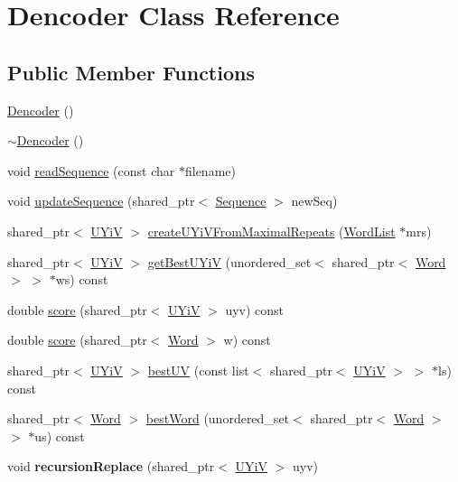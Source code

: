\hypertarget{classDencoder}{\section{Dencoder Class Reference}
\label{classDencoder}
}
\subsection*{Public Member Functions}
\begin{DoxyCompactItemize}
\item 
\hyperlink{classDencoder_a5e50eb7f889e5d1880111bf4cd42985b}{Dencoder} ()
\item 
\hyperlink{classDencoder_a1d030025676e52628f911f9262bfc892}{$\sim$\-Dencoder} ()
\item 
void \hyperlink{classDencoder_af5dc170b4feaff7ed8743ce1f7c17582}{read\-Sequence} (const char $\ast$filename)
\item 
void \hyperlink{classDencoder_aebc51ef45ee13914e51627b04a07ea27}{update\-Sequence} (shared\-\_\-ptr$<$ \hyperlink{classSequence}{Sequence} $>$ new\-Seq)
\item 
shared\-\_\-ptr$<$ \hyperlink{classUYiV}{U\-Yi\-V} $>$ \hyperlink{classDencoder_a2da7de0ad2cea870406d318316090583}{create\-U\-Yi\-V\-From\-Maximal\-Repeats} (\hyperlink{classWordList}{Word\-List} $\ast$mrs)
\item 
shared\-\_\-ptr$<$ \hyperlink{classUYiV}{U\-Yi\-V} $>$ \hyperlink{classDencoder_ad73c4ee6f7eb88cd2ecee07514d26b92}{get\-Best\-U\-Yi\-V} (unordered\-\_\-set$<$ shared\-\_\-ptr$<$ \hyperlink{classWord}{Word} $>$ $>$ $\ast$ws) const 
\item 
double \hyperlink{classDencoder_acfb48805d38b387440332b4f98d02bec}{score} (shared\-\_\-ptr$<$ \hyperlink{classUYiV}{U\-Yi\-V} $>$ uyv) const 
\item 
double \hyperlink{classDencoder_acb61796bd459bb115b277cb249a05aac}{score} (shared\-\_\-ptr$<$ \hyperlink{classWord}{Word} $>$ w) const 
\item 
shared\-\_\-ptr$<$ \hyperlink{classUYiV}{U\-Yi\-V} $>$ \hyperlink{classDencoder_a6276f38e8d95fa8603a1fe80e6de504e}{best\-U\-V} (const list$<$ shared\-\_\-ptr$<$ \hyperlink{classUYiV}{U\-Yi\-V} $>$ $>$ $\ast$ls) const 
\item 
shared\-\_\-ptr$<$ \hyperlink{classWord}{Word} $>$ \hyperlink{classDencoder_ab538a82eb2e31be2ad8e10b6d02fa959}{best\-Word} (unordered\-\_\-set$<$ shared\-\_\-ptr$<$ \hyperlink{classWord}{Word} $>$ $>$ $\ast$us) const 
\item 
\hypertarget{classDencoder_ae6f7c6f84888d022589549979c4be3ea}{void {\bfseries recursion\-Replace} (shared\-\_\-ptr$<$ \hyperlink{classUYiV}{U\-Yi\-V} $>$ uyv)}\label{classDencoder_ae6f7c6f84888d022589549979c4be3ea}


\end{DoxyCompactItemize}
